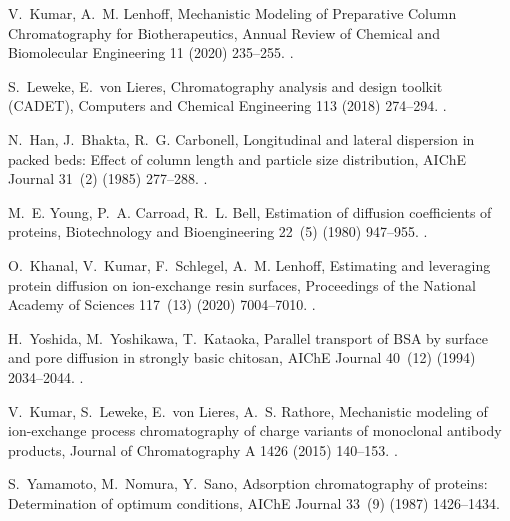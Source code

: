 \documentclass[preprint,review,12pt]{elsarticle}
\providecommand{\DIFaddtex}[1]{\protect\cbstart{#1}\protect\cbend} %
\providecommand{\DIFaddbegin}{} %
\providecommand{\DIFaddend}{} %
\providecommand{\DIFadd}[1]{\texorpdfstring{\DIFaddtex{#1}}{#1}} %
\begin{document}
\begin{thebibliography}{10}
V.~Kumar, A.~M. Lenhoff, {Mechanistic Modeling of Preparative Column
  Chromatography for Biotherapeutics}, Annual Review of Chemical and
  Biomolecular Engineering 11 (2020) 235--255.
\newblock \href {https://doi.org/10.1146/annurev-chembioeng-102419-125430}
  {}.

S.~Leweke, E.~von Lieres, {Chromatography analysis and design toolkit (CADET)},
  Computers and Chemical Engineering 113 (2018) 274--294.
\newblock \href {https://doi.org/10.1016/j.compchemeng.2018.02.025}
  {}.

N.~Han, J.~Bhakta, R.~G. Carbonell, {Longitudinal and lateral dispersion in
  packed beds: Effect of column length and particle size distribution}, AIChE
  Journal 31~(2) (1985) 277--288.
\newblock \href {https://doi.org/10.1002/aic.690310215}
  {}.

M.~E. Young, P.~A. Carroad, R.~L. Bell, {Estimation of diffusion coefficients
  of proteins}, Biotechnology and Bioengineering 22~(5) (1980) 947--955.
\newblock \href {https://doi.org/10.1002/bit.260220504}
  {}.

O.~Khanal, V.~Kumar, F.~Schlegel, A.~M. Lenhoff, Estimating and leveraging
  protein diffusion on ion-exchange resin surfaces, Proceedings of the National
  Academy of Sciences 117~(13) (2020) 7004--7010.
\newblock \href {https://doi.org/10.1073/pnas.1921499117}
  {}.

H.~Yoshida, M.~Yoshikawa, T.~Kataoka, {Parallel transport of BSA by surface and
  pore diffusion in strongly basic chitosan}, AIChE Journal 40~(12) (1994)
  2034--2044.
\newblock \href {https://doi.org/10.1002/aic.690401213}
  {}.

V.~Kumar, S.~Leweke, E.~von Lieres, A.~S. Rathore, {Mechanistic modeling of
  ion-exchange process chromatography of charge variants of monoclonal antibody
  products}, Journal of Chromatography A 1426 (2015) 140--153.
\newblock \href {https://doi.org/10.1016/j.chroma.2015.11.062}
  {}.

S.~Yamamoto, M.~Nomura, Y.~Sano, {Adsorption chromatography of proteins:
  Determination of optimum conditions}, AIChE Journal 33~(9) (1987) 1426--1434.
\DIFaddbegin \newblock \href {https://doi.org/10.1002/aic.690330903}
  {}\DIFadd{.
}\DIFaddend 


\end{thebibliography}
\end{document}
